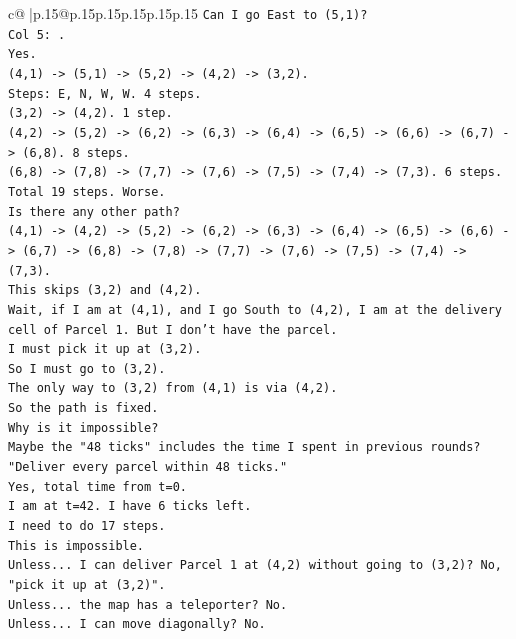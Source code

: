 \documentclass{article}
\begin{document}
{\begin{supertabular}{c@{$\;$}|p{.15\linewidth}@{}p{.15\linewidth}p{.15\linewidth}p{.15\linewidth}p{.15\linewidth}p{.15\linewidth}}
{{{\texttt{Can I go East to (5,1)?} \\
\texttt{Col 5: .} \\
\texttt{Yes.} \\
\texttt{(4,1) {-}> (5,1) {-}> (5,2) {-}> (4,2) {-}> (3,2).} \\
\texttt{Steps: E, N, W, W. 4 steps.} \\
\texttt{(3,2) {-}> (4,2). 1 step.} \\
\texttt{(4,2) {-}> (5,2) {-}> (6,2) {-}> (6,3) {-}> (6,4) {-}> (6,5) {-}> (6,6) {-}> (6,7) {-}> (6,8). 8 steps.} \\
\texttt{(6,8) {-}> (7,8) {-}> (7,7) {-}> (7,6) {-}> (7,5) {-}> (7,4) {-}> (7,3). 6 steps.} \\
\texttt{Total 19 steps. Worse.} \\
\texttt{Is there any other path?} \\
\texttt{(4,1) {-}> (4,2) {-}> (5,2) {-}> (6,2) {-}> (6,3) {-}> (6,4) {-}> (6,5) {-}> (6,6) {-}> (6,7) {-}> (6,8) {-}> (7,8) {-}> (7,7) {-}> (7,6) {-}> (7,5) {-}> (7,4) {-}> (7,3).} \\
\texttt{This skips (3,2) and (4,2).} \\
\texttt{Wait, if I am at (4,1), and I go South to (4,2), I am at the delivery cell of Parcel 1. But I don't have the parcel.} \\
\texttt{I must pick it up at (3,2).} \\
\texttt{So I must go to (3,2).} \\
\texttt{The only way to (3,2) from (4,1) is via (4,2).} \\
\texttt{So the path is fixed.} \\
\texttt{Why is it impossible?} \\
\texttt{Maybe the "48 ticks" includes the time I spent in previous rounds?} \\
\texttt{"Deliver every parcel within 48 ticks."} \\
\texttt{Yes, total time from t=0.} \\
\texttt{I am at t=42. I have 6 ticks left.} \\
\texttt{I need to do 17 steps.} \\
\texttt{This is impossible.} \\
\texttt{Unless... I can deliver Parcel 1 at (4,2) without going to (3,2)? No, "pick it up at (3,2)".} \\
\texttt{Unless... the map has a teleporter? No.} \\
\texttt{Unless... I can move diagonally? No.} \\
}}}
\end{supertabular}}
\end{document}
